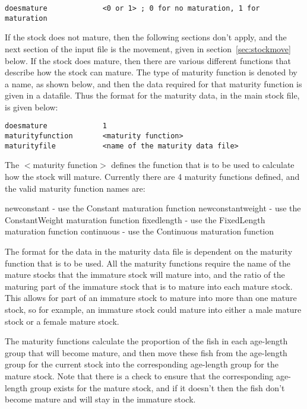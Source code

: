 \documentclass[10pt,twoside]{book}
\begin{document}
{\small\begin{verbatim}
doesmature             <0 or 1> ; 0 for no maturation, 1 for maturation
\end{verbatim}}

If the stock does not mature, then the following sections don't apply, and the next section of the input file is the movement, given in section~\ref{sec:stockmove} below.  If the stock does mature, then there are various different functions that describe how the stock can mature.  The type of maturity function is denoted by a name, as shown below, and then the data required for that maturity function is given in a datafile.  Thus the format for the maturity data, in the main stock file, is given below:

{\small\begin{verbatim}
doesmature             1
maturityfunction       <maturity function>
maturityfile           <name of the maturity data file>
\end{verbatim}}

The $<$maturity function$>$ defines the function that is to be used to calculate how the stock will mature.  Currently there are 4 maturity functions defined, and the valid maturity function names are:

\bigskip
newconstant - use the Constant maturation function\newline
newconstantweight - use the ConstantWeight maturation function\newline
fixedlength - use the FixedLength maturation function\newline
continuous - use the Continuous maturation function

\bigskip
The format for the data in the maturity data file is dependent on the maturity function that is to be used.  All the maturity functions require the name of the mature stocks that the immature stock will mature into, and the ratio of the maturing part of the immature stock that is to mature into each mature stock.  This allows for part of an immature stock to mature into more than one mature stock, so for example, an immature stock could mature into either a male mature stock or a female mature stock.

\bigskip
The maturity functions calculate the proportion of the fish in each age-length group that will become mature, and then move these fish from the age-length group for the current stock into the corresponding age-length group for the mature stock.  Note that there is a check to ensure that the corresponding age-length group exists for the mature stock, and if it doesn't then the fish don't become mature and will stay in the immature stock.
\end{document}
